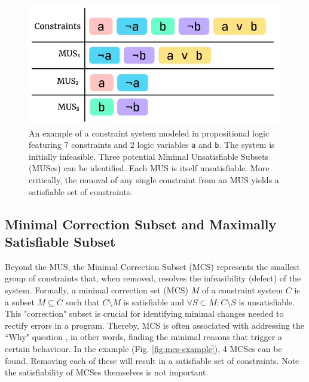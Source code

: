 \begin{figure}[hbt]
  \centering
  \includegraphics[width=0.8\linewidth]{MUS}
  \caption[An illustration of Minimal Unsatisfiable Subsets (MUSes)]{
    \label{fig:mus-example}
    An example of a constraint system modeled in propositional logic featuring 7 constraints and 2 logic variables \texttt{a} and \texttt{b}. The system is initially infeasible.  Three potential Minimal Unsatisfiable Subsets (MUSes) can be identified. Each MUS is itself unsatisfiable. More critically, the removal of any single constraint from an MUS yields a satisfiable set of constraints. }
\end{figure}

\subsection{Minimal Correction Subset and Maximally Satisfiable Subset}

Beyond the MUS, the Minimal Correction Subset (MCS) represents the smallest group of constraints that, when removed, resolves the infeasibility (defect) of the system. Formally, a minimal correction set (MCS) $M$ of a constraint system $C$ is a subset $M \subseteq C$ such that $C \setminus M$ is satisfiable and $\forall{S} \subset M : C \setminus S$ is unsatisfiable. This "correction" subset is crucial for identifying minimal changes needed to rectify errors in a program. Thereby, MCS is often associated with addressing the ``Why" question \cite{Ignatiev2020-xu, Nelson2017-ar}, in other words, finding the minimal reasons that trigger a certain behaviour. In the example (Fig. \ref{fig:mcs-example}), 4 MCSes can be found. Removing each of these will result in a satisfiable set of constraints. Note the satisfiability of MCSes themselves is not important.  


